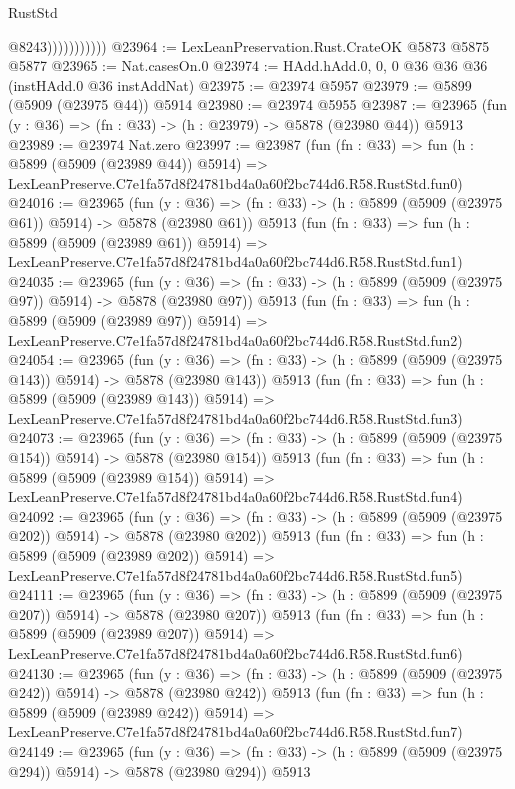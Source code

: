 \begin{lexlean}{RustStd}
\begin{coremodule}
{{                          @8243)))))))))))
@23964 := LexLeanPreservation.Rust.CrateOK @5873 @5875 @5877
@23965 := Nat.casesOn.{0}
@23974 := HAdd.hAdd.{0, 0, 0} @36 @36 @36 (instHAdd.{0} @36 instAddNat)
@23975 := @23974 @5957
@23979 := @5899 (@5909 (@23975 @44)) @5914
@23980 := @23974 @5955
@23987 := @23965 (fun (y : @36) => (fn : @33) -> (h : @23979) -> @5878 (@23980 @44)) @5913
@23989 := @23974 Nat.zero
@23997 := @23987
    (fun (fn : @33) =>
    fun (h : @5899 (@5909 (@23989 @44)) @5914) =>
    LexLeanPreserve.C7e1fa57d8f24781bd4a0a60f2bc744d6.R58.RustStd.fun0)
@24016 := @23965
    (fun (y : @36) => (fn : @33) -> (h : @5899 (@5909 (@23975 @61)) @5914) -> @5878 (@23980 @61))
    @5913
    (fun (fn : @33) =>
    fun (h : @5899 (@5909 (@23989 @61)) @5914) =>
    LexLeanPreserve.C7e1fa57d8f24781bd4a0a60f2bc744d6.R58.RustStd.fun1)
@24035 := @23965
    (fun (y : @36) => (fn : @33) -> (h : @5899 (@5909 (@23975 @97)) @5914) -> @5878 (@23980 @97))
    @5913
    (fun (fn : @33) =>
    fun (h : @5899 (@5909 (@23989 @97)) @5914) =>
    LexLeanPreserve.C7e1fa57d8f24781bd4a0a60f2bc744d6.R58.RustStd.fun2)
@24054 := @23965
    (fun (y : @36) => (fn : @33) -> (h : @5899 (@5909 (@23975 @143)) @5914) -> @5878 (@23980 @143))
    @5913
    (fun (fn : @33) =>
    fun (h : @5899 (@5909 (@23989 @143)) @5914) =>
    LexLeanPreserve.C7e1fa57d8f24781bd4a0a60f2bc744d6.R58.RustStd.fun3)
@24073 := @23965
    (fun (y : @36) => (fn : @33) -> (h : @5899 (@5909 (@23975 @154)) @5914) -> @5878 (@23980 @154))
    @5913
    (fun (fn : @33) =>
    fun (h : @5899 (@5909 (@23989 @154)) @5914) =>
    LexLeanPreserve.C7e1fa57d8f24781bd4a0a60f2bc744d6.R58.RustStd.fun4)
@24092 := @23965
    (fun (y : @36) => (fn : @33) -> (h : @5899 (@5909 (@23975 @202)) @5914) -> @5878 (@23980 @202))
    @5913
    (fun (fn : @33) =>
    fun (h : @5899 (@5909 (@23989 @202)) @5914) =>
    LexLeanPreserve.C7e1fa57d8f24781bd4a0a60f2bc744d6.R58.RustStd.fun5)
@24111 := @23965
    (fun (y : @36) => (fn : @33) -> (h : @5899 (@5909 (@23975 @207)) @5914) -> @5878 (@23980 @207))
    @5913
    (fun (fn : @33) =>
    fun (h : @5899 (@5909 (@23989 @207)) @5914) =>
    LexLeanPreserve.C7e1fa57d8f24781bd4a0a60f2bc744d6.R58.RustStd.fun6)
@24130 := @23965
    (fun (y : @36) => (fn : @33) -> (h : @5899 (@5909 (@23975 @242)) @5914) -> @5878 (@23980 @242))
    @5913
    (fun (fn : @33) =>
    fun (h : @5899 (@5909 (@23989 @242)) @5914) =>
    LexLeanPreserve.C7e1fa57d8f24781bd4a0a60f2bc744d6.R58.RustStd.fun7)
@24149 := @23965
    (fun (y : @36) => (fn : @33) -> (h : @5899 (@5909 (@23975 @294)) @5914) -> @5878 (@23980 @294))
    @5913
}}
\end{coremodule}
\end{lexlean}
